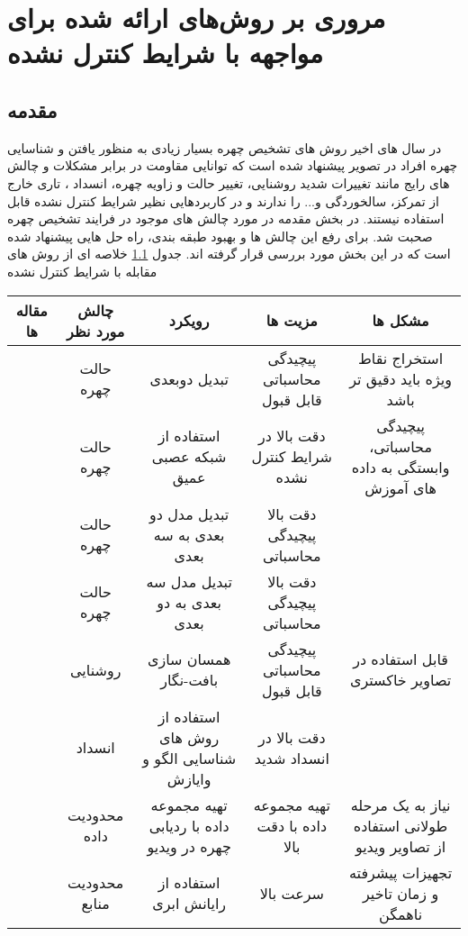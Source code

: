 \chapter{مروری بر روش‌های ارائه شده برای مواجهه با شرایط کنترل نشده}
\section{مقدمه}
در سال های اخیر روش های تشخیص چهره بسیار زیادی به منظور یافتن و شناسایی چهره افراد در تصویر پیشنهاد شده است که توانایی مقاومت در برابر مشکلات و چالش های رایج مانند تغییرات شدید روشنایی، تغییر حالت و زاویه چهره، انسداد ، تاری خارج از تمرکز، سالخوردگی و... را ندارند و در کاربردهایی نظیر شرایط کنترل نشده قابل استفاده نیستند. در بخش مقدمه در مورد چالش های موجود در فرایند تشخیص چهره صحبت شد. برای رفع این چالش ها و بهبود طبقه بندی، راه حل هایی پیشنهاد شده است که در این بخش مورد بررسی قرار گرفته اند.
جدول \ref{table3-1} خلاصه ای از روش های مقابله با شرایط کنترل نشده

\begin{table}[ht]
\label{table3-1}
\begin{center}
\resizebox{\textwidth}{!}
{
\begin{tabular}{|c|c|c|c|c|}
\hline 
مقاله ها & چالش مورد نظر & رویکرد & مزیت ها & مشکل ها
\\
\hline 
\cite{HAGHIGHAT201623, LV2016465, amos2016openface, 6196234}
& حالت چهره	 & تبدیل دوبعدی & 	پیچیدگی محاسباتی قابل قبول & 	استخراج نقاط ویژه باید دقیق تر باشد
 \\
\hline
\cite{wu2016facial, 7477555, 7780892, 7532959, 7298667}
 & حالت چهره & 	استفاده از شبکه عصبی عمیق & دقت بالا در شرایط کنترل نشده & 	پیچیدگی محاسباتی، وابستگی به داده های آموزش 
\\
\hline
\cite{HU2017366, hassner2014effective, 7298679, 7006757, 6905796}
 & حالت چهره & 	تبدیل مدل دو بعدی به سه بعدی & 	دقت بالا 	پیچیدگی محاسباتی &
\\
\hline 
\cite{DING2017144}
& حالت چهره & 	تبدیل مدل سه بعدی به دو بعدی & 	دقت بالا 	پیچیدگی محاسباتی &
\\
\hline
\cite{6196234, HUSSAINSHAH201597}
 & روشنایی	 & همسان سازی بافت-نگار & 	پیچیدگی محاسباتی قابل قبول & 	قابل استفاده در تصاویر خاکستری
\\
\hline
\cite{7015448, WU2018256}
 & انسداد	 & استفاده از روش های شناسایی الگو و وایازش & 	دقت بالا در انسداد شدید &	
\\
\hline
\cite{7984553}
 & محدودیت داده	 & تهیه مجموعه داده با ردیابی چهره در ویدیو & 	تهیه مجموعه داده با دقت بالا & 	نیاز به یک مرحله طولانی استفاده از تصاویر ویدیو
\\
\hline
\cite{6249269, HU2018582}
 & محدودیت منابع & 	استفاده از رایانش ابری & 	سرعت بالا & 	تجهیزات پیشرفته و زمان تاخیر ناهمگن
\\
\hline
\end{tabular}}
\end{center} 
\end{table} 

